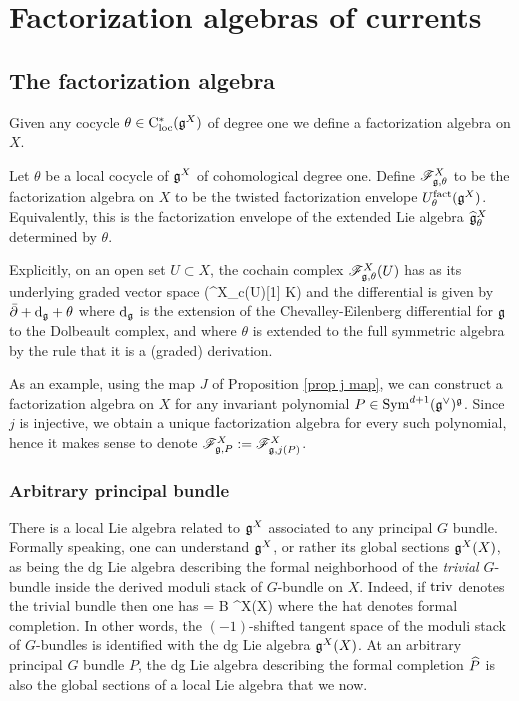 \section{Factorization algebras of currents}


\subsection{The factorization algebra}

Given any cocycle $\theta \in \cloc^*(\fg^X)$ of degree one we define a factorization algebra on $X$. 

\begin{dfn} Let $\theta$ be a local cocycle of $\fg^X$ of cohomological degree one. Define $\sF_{\fg,\theta}^X$ to be the factorization algebra on $X$ to be the twisted factorization envelope $U^{\rm fact}_\theta (\fg^X)$. 
Equivalently, this is the factorization envelope of the extended Lie algebra $\Hat{\fg}^X_\theta$ determined by $\theta$. 
\end{dfn}

Explicitly, on an open set $U \subset X$, the cochain complex $\sF^X_{\fg,\theta}(U)$ has as its underlying graded vector space
\ben
\Sym\left(\fg^X_{c}(U)[1] \oplus \CC \cdot K\right)
\een
and the differential is given by $\dbar + \d_\fg + \theta$ where $\d_\fg$ is the extension of the Chevalley-Eilenberg differential for $\fg$ to the Dolbeault complex, and where $\theta$ is extended to the full symmetric algebra by the rule that it is a (graded) derivation. 

\begin{eg} As an example, using the map $J$ of Proposition \ref{prop j map}, we can construct a factorization algebra on $X$ for any invariant polynomial $P \in \Sym^{d+1}(\fg^\vee)^\fg$. Since $j$ is injective, we obtain a unique factorization algebra for every such polynomial, hence it makes sense to denote $\sF^X_{\fg, P} := \sF^X_{\fg,j(P)}$. 
\end{eg}

\subsubsection{Arbitrary principal bundle}

There is a local Lie algebra related to $\fg^X$ associated to any principal $G$ bundle. Formally speaking, one can understand $\fg^X$, or rather its global sections $\fg^X(X)$, as being the dg Lie algebra describing the formal neighborhood of the {\em trivial} $G$-bundle inside the derived moduli stack of $G$-bundle on $X$. Indeed, if ${\rm triv}$ denotes the trivial bundle then one has
\ben
{} = B \fg^X(X)
\een
where the hat denotes formal completion. In other words, the $(-1)$-shifted tangent space of the moduli stack of $G$-bundles is identified with the dg Lie algebra $\fg^X(X)$. At an arbitrary principal $G$ bundle $P$, the dg Lie algebra describing the formal completion $\Hat{P}$ is also the global sections of a local Lie algebra that we now. 


